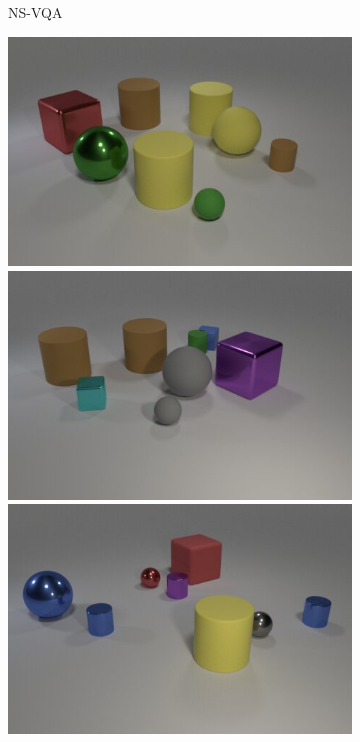 \begin{figure}
\begin{subfigure}{.3225\linewidth}
\caption{NS-VQA}
\end{subfigure}
\hfill
\begin{subfigure}{.3225\linewidth}
\centering
\includegraphics[width=\linewidth]{figures/clevr/output/2.jpg}\\
\includegraphics[width=\linewidth]{figures/clevr/output/3.jpg}\\
\includegraphics[width=\linewidth]{figures/clevr/output/4.jpg}\\

\end{subfigure}
\end{figure}
